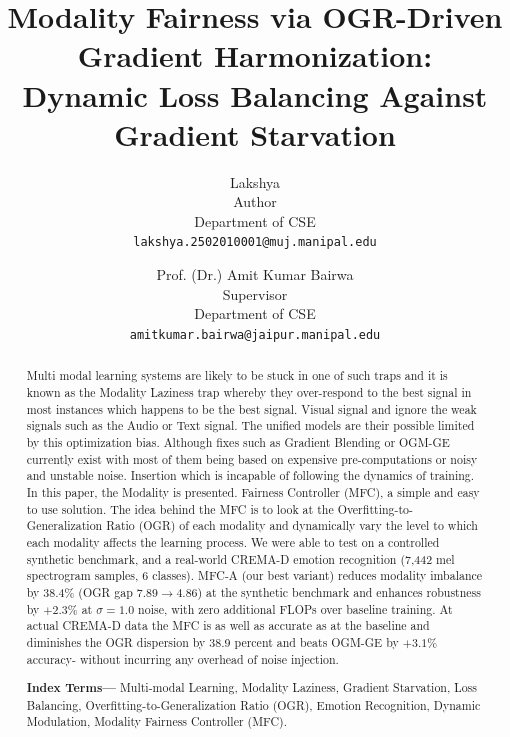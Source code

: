 \documentclass[10pt, twocolumn, letterpaper]{article}
\title{\textbf{Modality Fairness via OGR-Driven Gradient Harmonization: \\ Dynamic Loss Balancing Against Gradient Starvation}}
\author{
Lakshya \\
Author\\
Department of CSE \\
{\tt\small lakshya.2502010001@muj.manipal.edu}
\and
Prof. (Dr.) Amit Kumar Bairwa\\
Supervisor \\
Department of CSE \\
{\tt\small amitkumar.bairwa@jaipur.manipal.edu}
}
\begin{document}
\maketitle

\begin{abstract}
Multi modal learning systems are likely to be stuck in one of such traps and it is known as the Modality Laziness trap whereby they over-respond to the best signal in most instances which happens to be the best signal. Visual signal and ignore the weak signals such as the Audio or Text signal. The unified models are their possible limited by this optimization bias. Although fixes such as Gradient Blending or OGM-GE currently exist with most of them being based on expensive pre-computations or noisy and unstable noise. Insertion which is incapable of following the dynamics of training. In this paper, the Modality is presented. Fairness Controller (MFC), a simple and easy to use solution. The idea behind the MFC is to look at the Overfitting-to-Generalization Ratio (OGR) of each modality and dynamically vary the level to which each modality affects the learning process. We were able to test on a controlled synthetic benchmark, and a real-world CREMA-D emotion recognition (7,442 mel spectrogram samples, 6 classes). MFC-A (our best variant) reduces modality imbalance by 38.4\% (OGR gap 7.89$\to$4.86) at the synthetic benchmark and enhances robustness by $+2.3\%$ at $\sigma{=}1.0$ noise, with zero additional FLOPs over baseline training. At actual CREMA-D data the MFC is as well as accurate as at the baseline and diminishes the OGR dispersion by 38.9 percent and beats OGM-GE by $+3.1\%$ accuracy- without incurring any overhead of noise injection.

\noindent\textbf{Index Terms---} Multi-modal Learning, Modality Laziness, Gradient Starvation, Loss Balancing, Overfitting-to-Generalization Ratio (OGR), Emotion Recognition, Dynamic Modulation, Modality Fairness Controller (MFC).
\end{abstract}

\end{document}
